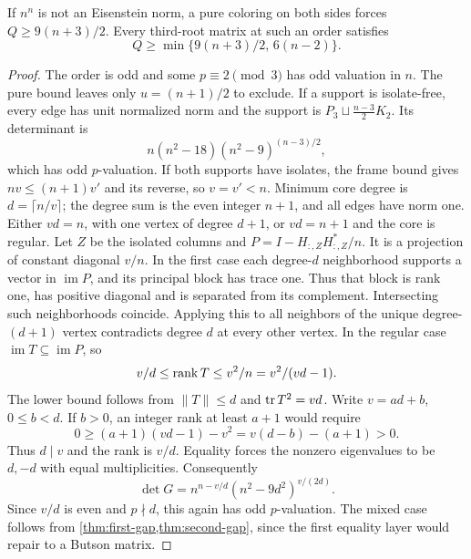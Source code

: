 \begin{theorem}\label{thm:odd-gap}
If $n^n$ is not an Eisenstein norm, a pure coloring on both sides forces $Q\ge9(n+3)/2$. Every third-root matrix at such an order satisfies
\[Q\ge\min\{9(n+3)/2,\,6(n-2)\}.\]
\end{theorem}
\begin{proof}
The order is odd and some $p\equiv2\pmod3$ has odd valuation in $n$. The pure bound leaves only $u=(n+1)/2$ to exclude. If a support is isolate-free, every edge has unit normalized norm and the support is $P_3\sqcup\frac{n-3}{2}K_2$. Its determinant is
\[n(n^2-18)(n^2-9)^{(n-3)/2},\]
which has odd $p$-valuation.
If both supports have isolates, the frame bound gives $nv\le(n+1)v'$ and its reverse, so $v=v'<n$. Minimum core degree is $d=\lceil n/v\rceil$; the degree sum is the even integer $n+1$, and all edges have norm one. Either $vd=n$, with one vertex of degree $d+1$, or $vd=n+1$ and the core is regular.
Let $Z$ be the isolated columns and $P=I-H_{:,Z}H_{:,Z}^*/n$. It is a projection of constant diagonal $v/n$. In the first case each degree-$d$ neighborhood supports a vector in $\operatorname{im}P$, and its principal block has trace one. Thus that block is rank one, has positive diagonal and is separated from its complement. Intersecting such neighborhoods coincide. Applying this to all neighbors of the unique degree-$(d+1)$ vertex contradicts degree $d$ at every other vertex.
In the regular case $\operatorname{im}T\subseteq\operatorname{im}P$, so
\[v/d\le\operatorname{rank} T\le v^2/n=v^2/(vd-1).\]
The lower bound follows from $\|T\|\le d$ and $\operatorname{tr} T^2=vd$. Write $v=ad+b$, $0\le b<d$. If $b>0$, an integer rank at least $a+1$ would require
\[0\ge(a+1)(vd-1)-v^2=v(d-b)-(a+1)>0.\]
Thus $d\mid v$ and the rank is $v/d$. Equality forces the nonzero eigenvalues to be $d,-d$ with equal multiplicities. Consequently
\[\det G=n^{n-v/d}(n^2-9d^2)^{v/(2d)}.\]
Since $v/d$ is even and $p\nmid d$, this again has odd $p$-valuation. The mixed case follows from \cref{thm:first-gap,thm:second-gap}, since the first equality layer would repair to a Butson matrix.
\end{proof}


